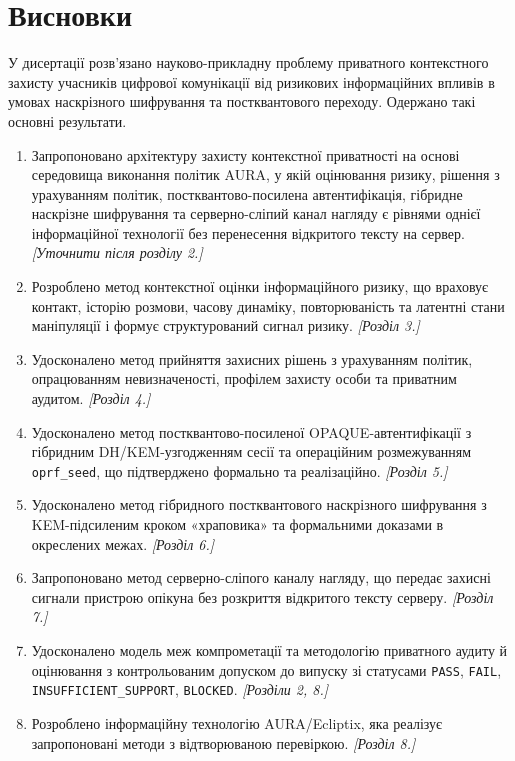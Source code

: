 \chapter*{Висновки}


У дисертації розв'язано науково-прикладну проблему приватного контекстного захисту учасників цифрової комунікації від ризикових інформаційних впливів в умовах наскрізного шифрування та постквантового переходу. Одержано такі основні результати.

\begin{enumerate}
  \item Запропоновано архітектуру захисту контекстної приватності на основі середовища виконання політик AURA, у якій оцінювання ризику, рішення з урахуванням політик, постквантово-посилена автентифікація, гібридне наскрізне шифрування та серверно-сліпий канал нагляду є рівнями однієї інформаційної технології без перенесення відкритого тексту на сервер. \emph{[Уточнити після розділу 2.]}
  \item Розроблено метод контекстної оцінки інформаційного ризику, що враховує контакт, історію розмови, часову динаміку, повторюваність та латентні стани маніпуляції і формує структурований сигнал ризику. \emph{[Розділ 3.]}
  \item Удосконалено метод прийняття захисних рішень з урахуванням політик, опрацюванням невизначеності, профілем захисту особи та приватним аудитом. \emph{[Розділ 4.]}
  \item Удосконалено метод постквантово-посиленої OPAQUE-автентифікації з гібридним DH/KEM-узгодженням сесії та операційним розмежуванням \texttt{oprf\_seed}, що підтверджено формально та реалізаційно. \emph{[Розділ 5.]}
  \item Удосконалено метод гібридного постквантового наскрізного шифрування з KEM-підсиленим кроком «храповика» та формальними доказами в окреслених межах. \emph{[Розділ 6.]}
  \item Запропоновано метод серверно-сліпого каналу нагляду, що передає захисні сигнали пристрою опікуна без розкриття відкритого тексту серверу. \emph{[Розділ 7.]}
  \item Удосконалено модель меж компрометації та методологію приватного аудиту й оцінювання з контрольованим допуском до випуску зі статусами \texttt{PASS}, \texttt{FAIL}, \texttt{INSUFFICIENT\_SUPPORT}, \texttt{BLOCKED}. \emph{[Розділи 2, 8.]}
  \item Розроблено інформаційну технологію AURA/Ecliptix, яка реалізує запропоновані методи з відтворюваною перевіркою. \emph{[Розділ 8.]}
\end{enumerate}

